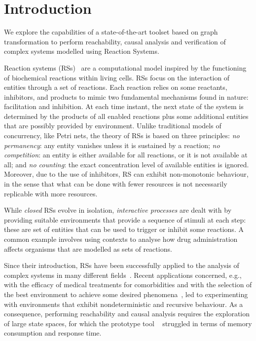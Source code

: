 
\section{Introduction}

We explore the capabilities of a state-of-the-art toolset based on graph transformation to perform reachability, causal analysis and verification of complex systems modelled using Reaction Systems.

Reaction systems (RSs)~\cite{DBLP:journals/fuin/EhrenfeuchtR07} are a computational model inspired by the functioning of biochemical reactions within living cells. 
RSs focus on the interaction of entities through a set of reactions. 
Each reaction relies on some reactants, inhibitors, and products to mimic two fundamental mechanisms found in nature: facilitation and inhibition.
At each time instant, the next state of the system is determined by the products of all enabled reactions plus some additional entities that are possibly provided by environment.
Unlike traditional models of concurrency, like Petri nets, the theory of RSs is based on three principles: \emph{no permanency}: any entity vanishes unless it is sustained by a reaction; \emph{no competition}: an entity is either available for all reactions, or it is not available at all; and \emph{no counting}: the exact concentration level of available entities is ignored.
Moreover, due to the use of inhibitors, RS can exhibit non-monotonic behaviour, in the sense that what can be done with fewer resources is not necessarily replicable with more resources.

While \emph{closed} RSs evolve in isolation, \emph{interactive processes} are dealt with by providing suitable environments that provide a sequence of stimuli at each step: these are set of entities that can be used to trigger or inhibit some reactions. A common example involves using contexts to analyse how drug administration affects organisms that are modelled as sets of reactions.

Since their introduction, RSs have been successfully applied to the analysis of complex systems in many different fields~\cite{ABP14,CMMBM12,Az17,OY16,DBLP:journals/ijfcs/EhrenfeuchtMR10,DBLP:journals/ijfcs/EhrenfeuchtMR11}.
Recent applications concerned, e.g., with the efficacy of medical treatments for comorbidities and with the selection of the best environment to achieve some desired phenomena~\cite{DBLP:conf/cmsb/BowlesBBFGM24,datamod2023}, led to experimenting with environments that exhibit nondeterministic and recursive behaviour.
As a consequence, performing reachability and causal analysis requires the exploration of large state spaces, for which the prototype tool \BioResolve~\cite{DBLP:journals/tcs/BrodoBF21} struggled in terms of  memory consumption and response time.
 
